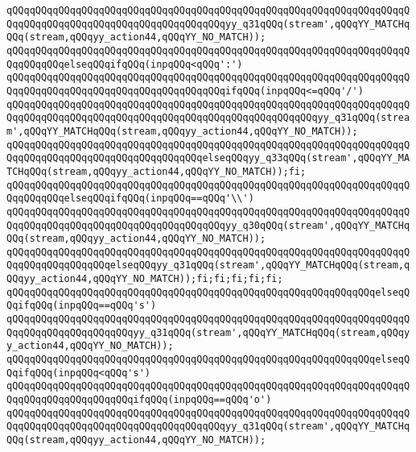 \verb|qQQqqQQqqQQqqQQqqQQqqQQqqQQqqQQqqQQqqQQqqQQqqQQqqQQqqQQqqQQqqQQqqQQqqQQqqQQqqQQqqQQqqQQqqQQqqQQqqQQqqQQqqQQqyy_q31qQQq(stream',qQQqYY_MATCHqQQq(stream,qQQqyy_action44,qQQqYY_NO_MATCH));|\newline
\verb|qQQqqQQqqQQqqQQqqQQqqQQqqQQqqQQqqQQqqQQqqQQqqQQqqQQqqQQqqQQqqQQqqQQqqQQqqQQqqQQqelseqQQqifqQQq(inpqQQq<qQQq':')|\newline
\verb|qQQqqQQqqQQqqQQqqQQqqQQqqQQqqQQqqQQqqQQqqQQqqQQqqQQqqQQqqQQqqQQqqQQqqQQqqQQqqQQqqQQqqQQqqQQqqQQqqQQqqQQqqQQqifqQQq(inpqQQq<=qQQq'/')|\newline
\verb|qQQqqQQqqQQqqQQqqQQqqQQqqQQqqQQqqQQqqQQqqQQqqQQqqQQqqQQqqQQqqQQqqQQqqQQqqQQqqQQqqQQqqQQqqQQqqQQqqQQqqQQqqQQqqQQqqQQqqQQqqQQqyy_q31qQQq(stream',qQQqYY_MATCHqQQq(stream,qQQqyy_action44,qQQqYY_NO_MATCH));|\newline
\verb|qQQqqQQqqQQqqQQqqQQqqQQqqQQqqQQqqQQqqQQqqQQqqQQqqQQqqQQqqQQqqQQqqQQqqQQqqQQqqQQqqQQqqQQqqQQqqQQqqQQqqQQqelseqQQqyy_q33qQQq(stream',qQQqYY_MATCHqQQq(stream,qQQqyy_action44,qQQqYY_NO_MATCH));fi;|\newline
\verb|qQQqqQQqqQQqqQQqqQQqqQQqqQQqqQQqqQQqqQQqqQQqqQQqqQQqqQQqqQQqqQQqqQQqqQQqqQQqqQQqelseqQQqifqQQq(inpqQQq==qQQq'\\')|\newline
\verb|qQQqqQQqqQQqqQQqqQQqqQQqqQQqqQQqqQQqqQQqqQQqqQQqqQQqqQQqqQQqqQQqqQQqqQQqqQQqqQQqqQQqqQQqqQQqqQQqqQQqqQQqqQQqyy_q30qQQq(stream',qQQqYY_MATCHqQQq(stream,qQQqyy_action44,qQQqYY_NO_MATCH));|\newline
\verb|qQQqqQQqqQQqqQQqqQQqqQQqqQQqqQQqqQQqqQQqqQQqqQQqqQQqqQQqqQQqqQQqqQQqqQQqqQQqqQQqqQQqqQQqelseqQQqyy_q31qQQq(stream',qQQqYY_MATCHqQQq(stream,qQQqyy_action44,qQQqYY_NO_MATCH));fi;fi;fi;fi;fi;|\newline
\verb|qQQqqQQqqQQqqQQqqQQqqQQqqQQqqQQqqQQqqQQqqQQqqQQqqQQqqQQqqQQqqQQqelseqQQqifqQQq(inpqQQq==qQQq's')|\newline
\verb|qQQqqQQqqQQqqQQqqQQqqQQqqQQqqQQqqQQqqQQqqQQqqQQqqQQqqQQqqQQqqQQqqQQqqQQqqQQqqQQqqQQqqQQqqQQqyy_q31qQQq(stream',qQQqYY_MATCHqQQq(stream,qQQqyy_action44,qQQqYY_NO_MATCH));|\newline
\verb|qQQqqQQqqQQqqQQqqQQqqQQqqQQqqQQqqQQqqQQqqQQqqQQqqQQqqQQqqQQqqQQqelseqQQqifqQQq(inpqQQq<qQQq's')|\newline
\verb|qQQqqQQqqQQqqQQqqQQqqQQqqQQqqQQqqQQqqQQqqQQqqQQqqQQqqQQqqQQqqQQqqQQqqQQqqQQqqQQqqQQqqQQqqQQqifqQQq(inpqQQq==qQQq'o')|\newline
\verb|qQQqqQQqqQQqqQQqqQQqqQQqqQQqqQQqqQQqqQQqqQQqqQQqqQQqqQQqqQQqqQQqqQQqqQQqqQQqqQQqqQQqqQQqqQQqqQQqqQQqqQQqqQQqyy_q31qQQq(stream',qQQqYY_MATCHqQQq(stream,qQQqyy_action44,qQQqYY_NO_MATCH));|\newline
